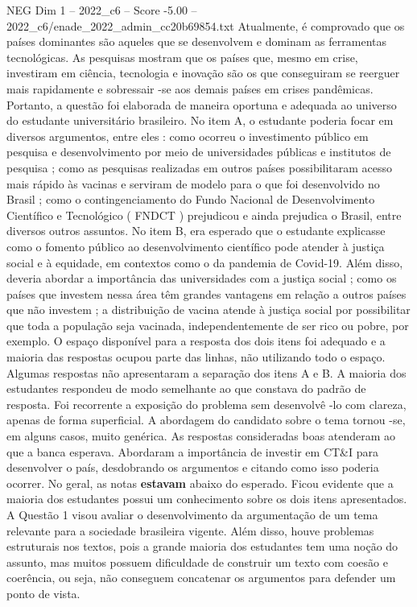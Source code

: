 \begin{textsample}{NEG Dim 1 – 2022\_c6 – Score -5.00 – 2022\_c6/enade\_2022\_admin\_cc20b69854.txt}
Atualmente, é comprovado que os países dominantes são aqueles que se desenvolvem e dominam as ferramentas tecnológicas.
As pesquisas mostram que os países que, mesmo em crise, investiram em ciência, tecnologia e inovação são os que conseguiram se reerguer mais rapidamente e sobressair -se aos demais países em crises pandêmicas.
Portanto, a questão foi elaborada de maneira oportuna e adequada ao universo do estudante universitário brasileiro.
No item A, o estudante poderia focar em diversos argumentos, entre eles : como ocorreu o investimento público em pesquisa e desenvolvimento por meio de universidades públicas e institutos de pesquisa ; como as pesquisas realizadas em outros países possibilitaram acesso mais rápido às vacinas e serviram de modelo para o que foi desenvolvido no Brasil ; como o contingenciamento do Fundo Nacional de Desenvolvimento Científico e Tecnológico ( FNDCT ) prejudicou e ainda prejudica o Brasil, entre diversos outros assuntos.
No item B, era esperado que o estudante explicasse como o fomento público ao desenvolvimento científico pode atender à justiça social e à equidade, em contextos como o da pandemia de Covid-19.
Além disso, deveria abordar a importância das universidades com a justiça social ; como os países que investem nessa área têm grandes vantagens em relação a outros países que não investem ; a distribuição de vacina atende à justiça social por possibilitar que toda a população seja vacinada, independentemente de ser rico ou pobre, por exemplo.
O espaço disponível para a resposta dos dois itens foi adequado e a maioria das respostas ocupou parte das linhas, não utilizando todo o espaço.
Algumas respostas não apresentaram a separação dos itens A e B.
A maioria dos estudantes respondeu de modo semelhante ao que constava do padrão de resposta.
Foi recorrente a exposição do problema sem desenvolvê -lo com clareza, apenas de forma superficial.
A abordagem do candidato sobre o tema tornou -se, em alguns casos, muito genérica.
As respostas consideradas boas atenderam ao que a banca esperava.
Abordaram a importância de investir em CT\&I para desenvolver o país, desdobrando os argumentos e citando como isso poderia ocorrer.
No geral, as notas \textbf{estavam} abaixo do esperado.
Ficou evidente que a maioria dos estudantes possui um conhecimento sobre os dois itens apresentados.
A Questão 1 visou avaliar o desenvolvimento da argumentação de um tema relevante para a sociedade brasileira vigente.
Além disso, houve problemas estruturais nos textos, pois a grande maioria dos estudantes tem uma noção do assunto, mas muitos possuem dificuldade de construir um texto com coesão e coerência, ou seja, não conseguem concatenar os argumentos para defender um ponto de vista.

\end{textsample}
